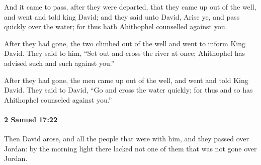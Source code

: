 			\begin{versebox}
					\item[BHS] 
					\item[ASV] And it came to pass, after they were departed, that they came up out of the well, and went and told king David; and they said unto David, Arise ye, and pass quickly over the water; for thus hath Ahithophel counselled against you.
					\item[NIV] After they had gone, the two climbed out of the well and went to inform King David. They said to him, “Set out and cross the river at once; Ahithophel has advised such and such against you.”
					\item[NRSV] After they had gone, the men came up out of the well, and went and told King David. They said to David, “Go and cross the water quickly; for thus and so has Ahithophel counseled against you.”
			\end{versebox}

		\paragraph{2 Samuel 17:22} %
			\label{2SAMUEL-17-22}

			Then David arose, and all the people that were with him, and they passed over Jordan: by the morning light there lacked not one of them that was not gone over Jordan.

